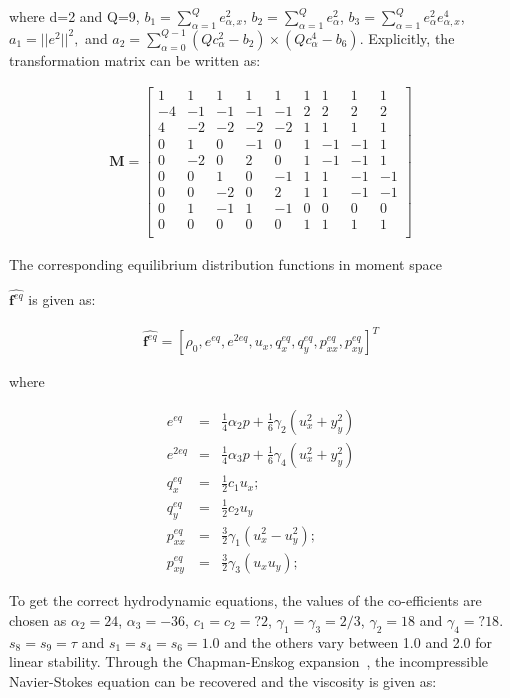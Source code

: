 \noindent where d=2 and Q=9, $b_1=\sum_{\alpha=1}^{Q}e_{\alpha,x}^2$, 
$b_2=\sum_{\alpha=1}^{Q}e_{\alpha}^2$, 
$b_3=\sum_{\alpha=1}^{Q}e_{\alpha}^2e_{\alpha,x}^4$, $a_1=||e^2||^2,$ and $a_2=\sum_{\alpha=0}^{Q-1}(Qc_{\alpha}^2-b_2)\times(Qc_{\alpha}^4-b_6)$. Explicitly, the transformation matrix can be written as:

\begin{align}
\mathbf{M}= \begin{bmatrix}
 1 &  1 &  1 &  1 &  1 &  1 &  1 &  1 &  1 \\
-4 & -1 & -1 & -1 & -1 &  2 &  2 &  2 &  2 \\ 
 4 & -2 & -2 & -2 & -2 &  1 &  1 &  1 &  1 \\
 0 &  1 &  0 & -1 &  0 &  1 & -1 & -1 &  1 \\
 0 & -2 &  0 &  2 &  0 &  1 & -1 & -1 &  1 \\
 0 &  0 &  1 &  0 & -1 &  1 &  1 & -1 & -1 \\
 0 &  0 & -2 &  0 &  2 &  1 &  1 & -1 & -1 \\
 0 &  1 & -1 &  1 & -1 &  0 &  0 &  0 &  0 \\
 0 &  0 &  0 &  0 &  0 &  1 &  1 &  1 &  1 \\
\end{bmatrix}
\end{align}

The corresponding equilibrium distribution functions in moment space 

$\widehat{\mathbf{f}^{eq}}$ is given as:

\begin{align}
\widehat{\mathbf{f}^{eq}}=\left[\rho_0,e^{eq},e^{2eq},u_x,q_x^{eq},q_y^{eq},p_{xx}^{eq},p_{xy}^{eq}\right]^T
\end{align}

\noindent where

\begin{align}
e^{eq} & = &\frac{1}{4}\alpha_2p+\frac{1}{6}\gamma_2(u_x^2+y_y^2)\\
e^{2eq} & = & \frac{1}{4}\alpha_3p+\frac{1}{6}\gamma_4(u_x^2+y_y^2)\\
q_x^{eq} & = & \frac{1}{2}c_1u_x;\\
q_y^{eq} & = & \frac{1}{2}c_2u_y \\
p_{xx}^{eq} & = & \frac{3}{2}\gamma_1(u_x^2 - u_y^2);\\
p_{xy}^{eq} & = & \frac{3}{2}\gamma_3(u_xu_y);
\end{align}

To get the correct hydrodynamic equations, the values of the co-efficients are 
chosen as $\alpha_2=24$,  $\alpha_3=-36$, $c_1=c_2=?2$, 
$\gamma_1=\gamma_3=2/3$, $\gamma_2=18$ and $\gamma_4=?18$. $s_8 = s_9 = \tau$ 
and $s_1=s_4=s_6=1.0$ and the others vary between 1.0 and 2.0 for linear 
stability. Through the Chapman-Enskog expansion~\citep{Du2006}, the 
incompressible Navier-Stokes equation can be recovered and the viscosity is 
given as:

